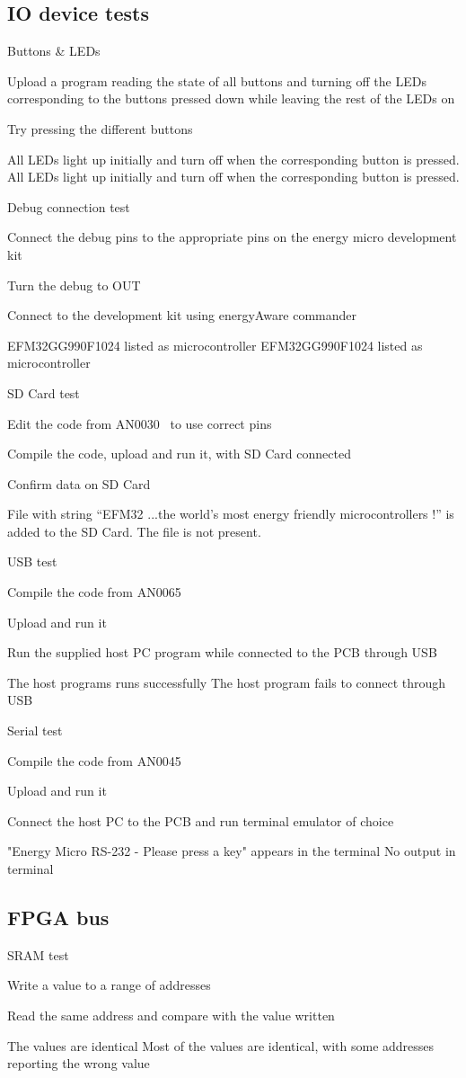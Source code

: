 \subsection{IO device tests}
\test
{Buttons \& LEDs}{
    \item{Upload a program reading the state of all buttons and turning off the LEDs corresponding to the buttons pressed down while leaving the rest of the LEDs on}
    \item{Try pressing the different buttons}
}{All LEDs light up initially and turn off when the corresponding button is pressed.}
{All LEDs light up initially and turn off when the corresponding button is pressed.}

\test
{Debug connection test}{
    \item{Connect the debug pins to the appropriate pins on the energy micro development kit}
    \item{Turn the debug to OUT}
    \item{Connect to the development kit using energyAware commander}
}{EFM32GG990F1024 listed as microcontroller}
{EFM32GG990F1024 listed as microcontroller}

\test
{SD Card test}{
    \item{Edit the code from AN0030~\cite{an0030} to use correct pins}
    \item{Compile the code, upload and run it, with SD Card connected}
    \item{Confirm data on SD Card}
}{File with string ``EFM32 ...the world's most energy friendly microcontrollers !'' is added to the SD Card.}
{The file is not present.}

\test
{USB test}{
    \item{Compile the code from AN0065~\cite{an0065}}
    \item{Upload and run it}
    \item{Run the supplied host PC program while connected to the PCB through USB}
}{The host programs runs successfully}
{The host program fails to connect through USB}

\test
{Serial test}{
    \item{Compile the code from AN0045~\cite{an0045}}
    \item{Upload and run it}
    \item{Connect the host PC to the PCB and run terminal emulator of choice}
}{"Energy Micro RS-232 - Please press a key" appears in the terminal}
{No output in terminal}

\subsection{FPGA bus}
\test
{SRAM test}{
    \item{Write a value to a range of addresses}
    \item{Read the same address and compare with the value written}
}{The values are identical}
{Most of the values are identical, with some addresses reporting the wrong value}


